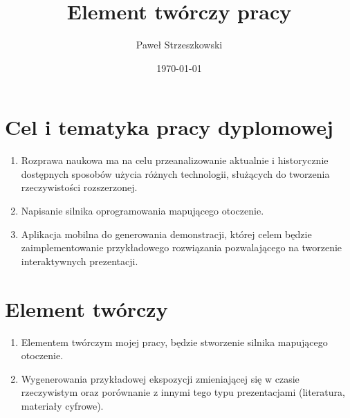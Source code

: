 \documentclass{article}
\title{Element twórczy pracy}
\author{Paweł Strzeszkowski}
\date{\today}
\begin{document}
\maketitle

\section{Cel i tematyka pracy dyplomowej}

\begin{enumerate}
    \item Rozprawa naukowa ma na celu przeanalizowanie aktualnie i historycznie dostępnych sposobów użycia różnych technologii, służących do tworzenia rzeczywistości rozszerzonej.
    \item Napisanie silnika oprogramowania mapującego otoczenie.
    \item Aplikacja mobilna do generowania demonstracji, której celem będzie zaimplementowanie przykładowego rozwiązania pozwalającego na tworzenie interaktywnych prezentacji.
\end{enumerate}

\section{Element twórczy}

\begin{enumerate}
    \item Elementem twórczym mojej pracy, będzie stworzenie silnika mapującego otoczenie.
    \item Wygenerowania przykładowej ekspozycji zmieniającej się w czasie rzeczywistym oraz porównanie z innymi tego typu prezentacjami (literatura, materiały cyfrowe).
\end{enumerate}
\end{document}
